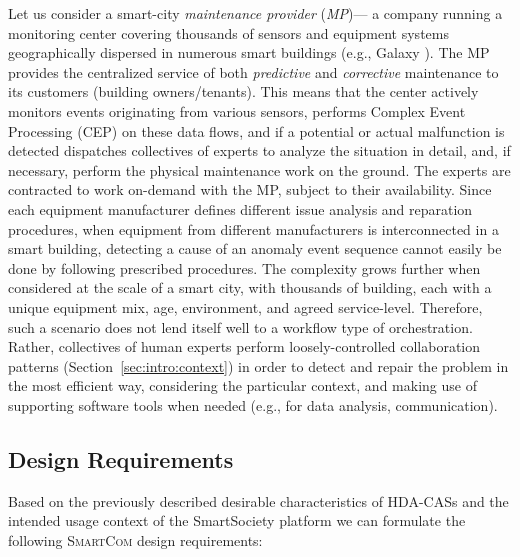 \documentclass{llncs}
\newcommand{\mdl}{\textsc{SmartCom}}
\begin{document}
      Let us consider a smart-city \emph{maintenance provider} (\emph{MP})--- a company running a monitoring center covering thousands of sensors and equipment systems geographically dispersed in numerous smart buildings (e.g., Galaxy \cite{Galaxy}). The MP provides the centralized service of both \emph{predictive} and \emph{corrective} maintenance to its customers (building owners/tenants). This means that the center actively monitors events originating from various sensors, performs Complex Event Processing (CEP) on these data flows, and if a potential or actual malfunction is detected dispatches collectives of experts to analyze the situation in detail, and, if necessary, perform the physical maintenance work on the ground. The experts are contracted to work on-demand with the MP, subject to their availability.
      Since each equipment manufacturer defines different issue analysis and reparation procedures, when equipment from different manufacturers is interconnected in a smart building, detecting a cause of an anomaly event sequence cannot easily be done by following prescribed procedures. 
      The complexity grows further when considered at the scale of a smart city, with thousands of building, each with a unique equipment mix, age, environment, and agreed service-level. Therefore, such a scenario does not lend itself well to a workflow type of orchestration. Rather, collectives of human experts perform loosely-controlled collaboration patterns (Section~\ref{sec:intro:context}) in order to detect and repair the problem in the most efficient way, considering the particular context, and making use of supporting software tools when needed (e.g., for data analysis, communication). 

    \subsection{Design Requirements}
    \label{sec:intro:reqs}

      Based on the previously described desirable characteristics of HDA-CASs and the intended usage context of the SmartSociety platform
      we can formulate the following \mdl{} design requirements:
      
\end{document}
